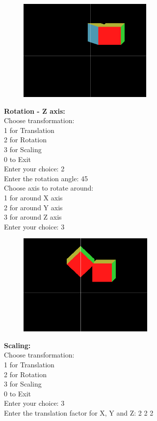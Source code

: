 \documentclass[9pt,letterpaper]{article}
\begin{document}
\begin{figure}[h]
    \centering
    \includegraphics[height=5cm]{Outputs/OP3.png}
\end{figure}

\newpage
\textbf{Rotation - Z axis:}\\

Choose transformation:   \\
1 for Translation        \\
2 for Rotation           \\
3 for Scaling            \\
0 to Exit                \\
Enter your choice: 2     \\

Enter the rotation angle: 45 \\
Choose axis to rotate around:\\
1 for around X axis          \\
2 for around Y axis          \\
3 for around Z axis          \\
Enter your choice: 3         \\

\begin{figure}[h]
    \centering
    \includegraphics[height=5cm]{Outputs/OP4.png}
\end{figure}

\newpage
\textbf{Scaling:}  \\

Choose transformation: \\
1 for Translation      \\
2 for Rotation         \\
3 for Scaling          \\
0 to Exit              \\
Enter your choice: 3   \\
Enter the translation factor for X, Y and Z: 2 2 2  \\
\end{document}
